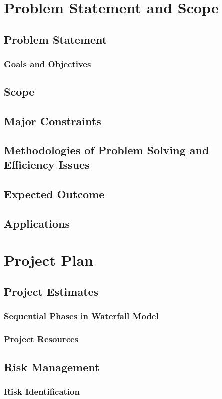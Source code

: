 \documentclass[a4paper, oneside, 12pt]{book}
\begin{document}
	\section{Problem Statement and Scope}
	\newpage
		\subsection{Problem Statement}
			\subsubsection{Goals and Objectives}
		\subsection{Scope}
		\subsection{Major Constraints}
		\subsection{Methodologies of Problem Solving and Efficiency Issues}
		\subsection{Expected Outcome}
		\subsection{Applications}
	\newpage
	\section{Project Plan}
	\newpage
		\subsection{Project Estimates}
			\subsubsection{Sequential Phases in Waterfall Model}
			\subsubsection{Project Resources}
		\subsection{Risk Management}
			\subsubsection{Risk Identification}
\end{document}
